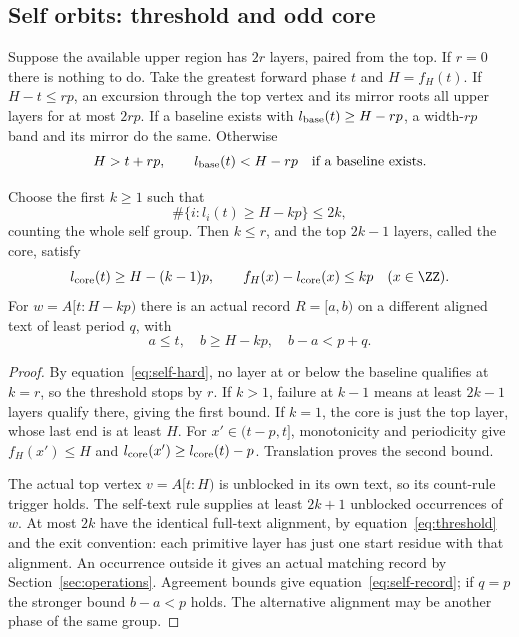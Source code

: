 \subsection{Self orbits: threshold and odd core}\label{sec:self}
Suppose the available upper region has $2r$ layers, paired from the top.
If $r=0$ there is nothing to do. Take the greatest forward phase $t$
and $H=f_H(t)$. If $H-t\le rp$, an excursion through the top vertex
and its mirror roots all upper layers for at most $2rp$.
If a baseline exists with $l_{\rm base}(t)\ge H-rp$, a width-$rp$
band and its mirror do the same. Otherwise
\begin{equation}\label{eq:self-hard}
H>t+rp,\qquad l_{\rm base}(t)<H-rp\quad\text{if a baseline exists}.
\end{equation}

\begin{lemma}\label{lem:odd-core}
Choose the first $k\ge1$ such that
\begin{equation}\label{eq:threshold}
\#\{i:l_i(t)\ge H-kp\}\le2k,
\end{equation}
counting the whole self group. Then $k\le r$, and the top $2k-1$
layers, called the core, satisfy
\begin{equation}\label{eq:core-band}
l_{\rm core}(t)\ge H-(k-1)p,\qquad
f_H(x)-l_{\rm core}(x)\le kp\quad(x\in\ZZ).
\end{equation}
For $w=A[t:H-kp)$ there is an actual record $R=[a,b)$ on a different
aligned text of least period $q$, with
\begin{equation}\label{eq:self-record}
a\le t,\quad b\ge H-kp,\quad b-a<p+q.
\end{equation}
\end{lemma}
\begin{proof}
By equation~\eqref{eq:self-hard}, no layer at or below the baseline qualifies
at $k=r$, so the threshold stops by $r$. If $k>1$, failure at $k-1$
means at least $2k-1$ layers qualify there, giving the first bound.
If $k=1$, the core is just the top layer, whose last end is at least
$H$. For $x'\in(t-p,t]$, monotonicity and periodicity give
$f_H(x')\le H$ and $l_{\rm core}(x')\ge l_{\rm core}(t)-p$.
Translation proves the second bound.

The actual top vertex $v=A[t:H)$ is unblocked in its own text, so its
count-rule trigger holds. The self-text rule supplies at least $2k+1$
unblocked occurrences of $w$. At most $2k$ have the identical full-text
alignment, by equation~\eqref{eq:threshold} and the exit convention: each primitive
layer has just one start residue with that alignment. An occurrence
outside it gives an actual matching record by Section~\ref{sec:operations}.
Agreement bounds give equation~\eqref{eq:self-record}; if $q=p$ the stronger
bound $b-a<p$ holds. The alternative alignment may be another phase
of the same group.
\end{proof}

